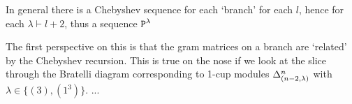 {%


\mdef 
In general there is a Chebyshev sequence for each `branch' for each $l$, 
hence for each $\lambda\vdash l+2$, 
thus a sequence ${\mathtt P}^\lambda$ 

The first perspective on this is that the gram matrices on a branch are `related' by the Chebyshev recursion. This is true on the nose if we look at the slice through the Bratelli diagram corresponding to 1-cup modules $\Delta^{n}_{(n-2,\lambda)}$ with $\lambda\in \{ (3), (1^3) \}$. 
... }




